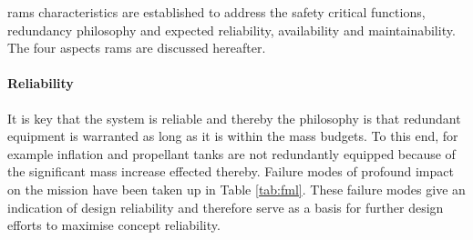 \acrfull{rams} characteristics are established to address the safety critical functions, redundancy philosophy and expected reliability, availability and maintainability. The four aspects \gls{rams} are discussed hereafter.

\paragraph{Reliability}
It is key that the system is reliable and thereby the philosophy is that redundant equipment is warranted as long as it is within the mass budgets. To this end, for example inflation and propellant tanks are not redundantly equipped because of the significant mass increase effected thereby. Failure modes of profound impact on the mission have been taken up in Table \ref{tab:fml}. These failure modes give an indication of design reliability and therefore serve as a basis for further design efforts to maximise concept reliability.


